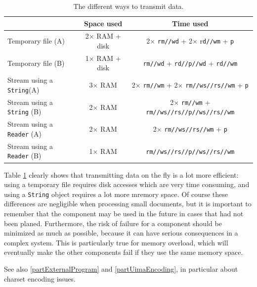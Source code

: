 \documentclass{article}
\begin{document}
\begin{table}[htbp]
\begin{center}
\begin{tabular}{|l|c|c|}
\hline
 & Space used & Time used\\
\hline
Temporary file (A)		& 2$\times$ RAM + disk	& 2$\times$ {\tt rm//wd} + 2$\times$ r{\tt d//wm} + {\tt p} \\
Temporary file (B)		& 1$\times$ RAM + disk & {\tt rm//wd} + {\tt rd//p//wd} + {\tt rd//wm}\\
\hline
\hline
Stream using a {\tt String}\footnotemark (A)	& 3$\times$ RAM	& 2$\times$ {\tt rm//wm} + 2$\times$ {\tt rm//ws//rs//wm} + {\tt p} \\
Stream using a {\tt String} (B)	& 2$\times$ RAM	& 2$\times$ {\tt rm//wm} + {\tt rm//ws//rs//p//ws//rs//wm}\\
\hline
\hline
Stream using a {\tt Reader} (A)	& 2$\times$ RAM	& 2$\times$ {\tt rm//ws//rs//wm} + {\tt p}\\
Stream using a {\tt Reader} (B)	& 1$\times$ RAM	& {\tt rm//ws//rs//p//ws//rs//wm}\\
\hline
\end{tabular}
\caption{\label{tableComparisonDataTransmission}The different ways to transmit data. }
\end{center}
\end{table}

Table \ref{tableComparisonDataTransmission} clearly shows that transmitting data on the fly is a lot more efficient: using a temporary file requires disk accesses which are very time consuming, and using a {\tt String} object requires a lot more mremory space. Of course these differences are negligible when processing small documents, but it is important to remember that the component may be used in the future in cases that had not been planed. Furthermore, the risk of failure for a component should be minimized as much as possible, because it can have serious consequences in a complex system. This is particularly true for memory overload, which will eventually make the other components fail if they use the same memory space.

See also \ref{partExternalProgram} and \ref{partUimaEncoding}, in particular about charset encoding issues.
\end{document}
